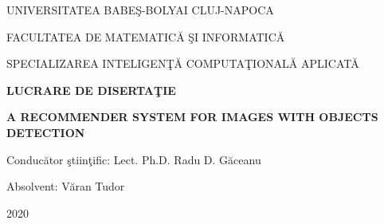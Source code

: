 \documentclass[a4paper, 12pt]{report}
\begin{document}
\begin{titlepage}
\sloppy
\begin{center}
\Large{UNIVERSITATEA BABE\c{S}-BOLYAI CLUJ-NAPOCA}

\Large{FACULTATEA DE MATEMATIC\u{A} \c{S}I INFORMATIC\u{A} }

\Large{SPECIALIZAREA INTELIGEN\c{T}\u{A} COMPUTA\c{T}IONAL\u{A} APLICAT\u{A}}



\vspace{3cm}

\Large \textbf{LUCRARE DE DISERTA\c{T}IE}
\par\vspace{1.3cm}
\Huge \textbf{A RECOMMENDER SYSTEM FOR IMAGES WITH OBJECTS DETECTION}

\end{center}
\vspace{2.5cm}

\begin{flushleft}
    \Large{Conduc\u{a}tor \c{s}tiin\c{t}ific: Lect. Ph.D. Radu D. G\u{a}ceanu}
\end{flushleft}

\vspace{1cm}

\begin{flushright}
\Large{Absolvent: V\u{a}ran Tudor}

\end{flushright}

\vspace{1cm}

\begin{center}
\Large{2020}
\end{center}

\end{titlepage}



\tableofcontents
\listoffigures
\listoftables












\renewcommand\bibname{Bibliography}
\printbibliography
\end{document}

